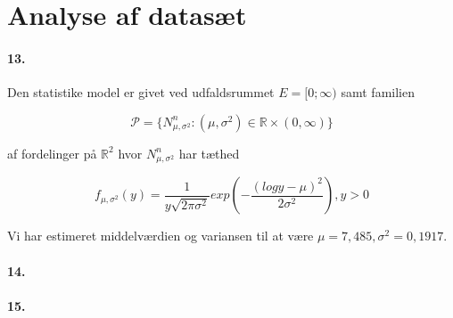 \section{Analyse af datasæt}

\paragraph{13.}
Den statistike model er givet ved udfaldsrummet $E=[0; \infty)$ samt
familien

\begin{equation*}
  \mathcal{P} =\{ N^n_{\mu,\sigma^2} : (\mu, \sigma^2) \in \mathbb{R}
  \times (0, \infty) \}
\end{equation*}

af fordelinger på $\mathbb{R}^2$ hvor $N^n_{\mu, \sigma^2}$ har tæthed

\begin{equation*}
  f_{\mu, \sigma^2}(y) = \frac{1}{y \sqrt{2\pi\sigma^2}} exp ( -
  \frac{(log y - \mu)^2}{2\sigma^2} ), y>0
\end{equation*}

Vi har estimeret middelværdien og variansen til at være $\mu = 7,485 ,
\sigma^2 = 0,1917$.



\paragraph{14.}


\paragraph{15.}
